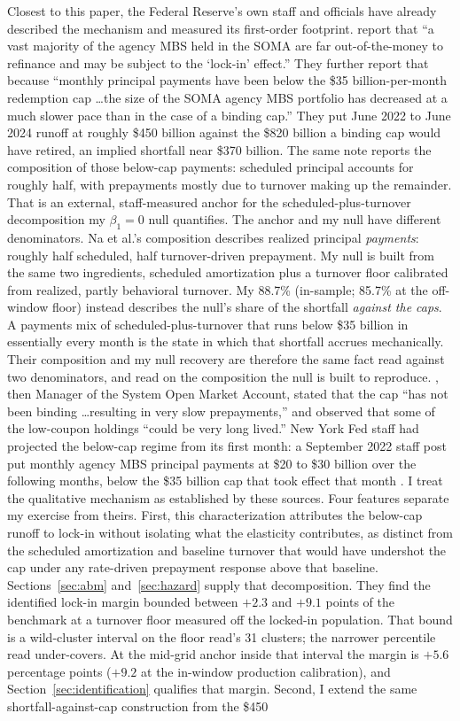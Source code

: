 \documentclass[12pt]{article}
\begin{document}
Closest to this paper, the Federal Reserve's own staff and officials have already described the mechanism and measured its first-order footprint. \citet{na2024} report that ``a vast majority of the agency MBS held in the SOMA are far out-of-the-money to refinance and may be subject to the `lock-in' effect.'' They further report that because ``monthly principal payments have been below the \$35 billion-per-month redemption cap \ldots the size of the SOMA agency MBS portfolio has decreased at a much slower pace than in the case of a binding cap.'' They put June 2022 to June 2024 runoff at roughly \$450 billion against the \$820 billion a binding cap would have retired, an implied shortfall near \$370 billion. The same note reports the composition of those below-cap payments: scheduled principal accounts for roughly half, with prepayments mostly due to turnover making up the remainder. That is an external, staff-measured anchor for the scheduled-plus-turnover decomposition my $\beta_1 = 0$ null quantifies. The anchor and my null have different denominators. Na et al.'s composition describes realized principal \emph{payments}: roughly half scheduled, half turnover-driven prepayment. My null is built from the same two ingredients, scheduled amortization plus a turnover floor calibrated from realized, partly behavioral turnover. My 88.7\% (in-sample; 85.7\% at the off-window floor) instead describes the null's share of the shortfall \emph{against the caps}. A payments mix of scheduled-plus-turnover that runs below \$35 billion in essentially every month is the state in which that shortfall accrues mechanically. Their composition and my null recovery are therefore the same fact read against two denominators, and read on the composition the null is built to reproduce. \citet{perli2024}, then Manager of the System Open Market Account, stated that the cap ``has not been binding \ldots resulting in very slow prepayments,'' and \citet{hammack2025} observed that some of the low-coupon holdings ``could be very long lived.'' New York Fed staff had projected the below-cap regime from its first month: a September 2022 staff post put monthly agency MBS principal payments at \$20 to \$30 billion over the following months, below the \$35 billion cap that took effect that month \citep{nyfed2022}. I treat the qualitative mechanism as established by these sources. Four features separate my exercise from theirs. First, this characterization attributes the below-cap runoff to lock-in without isolating what the elasticity contributes, as distinct from the scheduled amortization and baseline turnover that would have undershot the cap under any rate-driven prepayment response above that baseline. Sections~\ref{sec:abm} and~\ref{sec:hazard} supply that decomposition. They find the identified lock-in margin bounded between $+2.3$ and $+9.1$ points of the benchmark at a turnover floor measured off the locked-in population. That bound is a wild-cluster interval on the floor read's 31 clusters; the narrower percentile read under-covers. At the mid-grid anchor inside that interval the margin is $+5.6$ percentage points ($+9.2$ at the in-window production calibration), and Section~\ref{sec:identification} qualifies that margin. Second, I extend the same shortfall-against-cap construction from the \$450 
\end{document}
